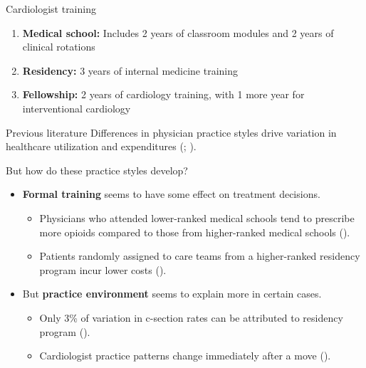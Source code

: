 \documentclass[10pt,aspectratio=169]{beamer}
\begin{document}
\begin{frame}{Cardiologist training}
    \begin{enumerate}
        \item \textbf{Medical school:} Includes 2 years of classroom modules and 2 years of clinical rotations

        \vspace{0.25cm}
        \item \textbf{Residency:} 3 years of internal medicine training 

        \vspace{0.25cm}
        \item \textbf{Fellowship:} 2 years of cardiology training, with 1 more year for interventional cardiology 
    \end{enumerate}
\end{frame}

\begin{frame}{Previous literature}
    Differences in physician practice styles drive variation in healthcare utilization and expenditures (\cite{cutler_physician_2019}; \cite{badinski_geographic_2023}).

    \vspace{5mm}
    \begin{block}{But how do these practice styles develop?}
        \begin{itemize}
            \item \textbf{Formal training} seems to have some effect on treatment decisions. 
                \begin{itemize}
                    \item Physicians who attended lower-ranked medical schools tend to prescribe more opioids compared to those from higher-ranked medical schools (\cite{schnell_addressing_2018}). 
                    \item Patients randomly assigned to care teams from a higher-ranked residency program incur lower costs (\cite{doyle_returns_2010}). 
                \end{itemize}
            \item But \textbf{practice environment} seems to explain more in certain cases. 
                \begin{itemize}
                    \item Only 3\% of variation in c-section rates can be attributed to residency program (\cite{epstein_formation_2009}). 
                    \item Cardiologist practice patterns change immediately after a move (\cite{molitor_evolution_2018}). 
                \end{itemize}
        \end{itemize}
    \end{block}
\end{frame}
\end{document}
